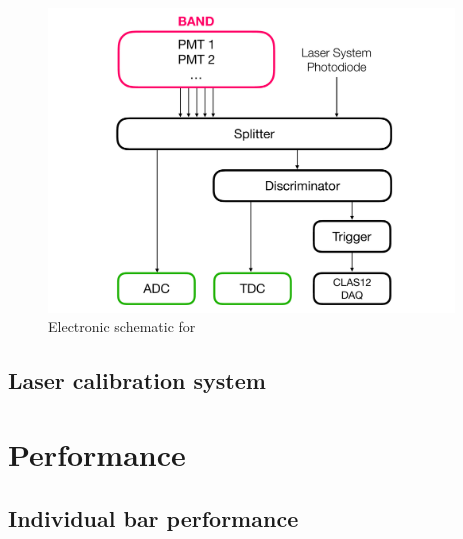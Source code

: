 \documentclass[review]{elsarticle}
\begin{document}
\begin{figure}[h!]
	\centering
		\includegraphics[width=0.96\textwidth]{figures/electronics-diag.pdf}
	\caption{Electronic schematic for }
	\label{fig:electronic-diag}
\end{figure}

\subsection{Laser calibration system}



\section{Performance}
\subsection{Individual bar performance}
\end{document}
